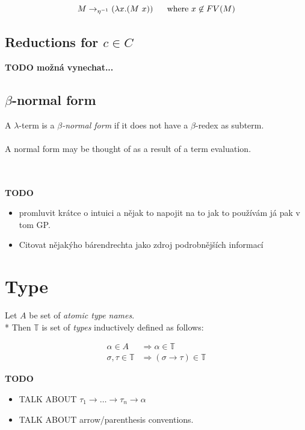 \documentclass[12pt,a4paper]{report}
\newcommand{\lterm}{$\lambda$-term\xspace}
\begin{document}
$$M \rightarrow_{\eta^{-1}} ( \lambda x . (M~x) ) \text{ ~~~~where } x \not\in FV(M) $$



\subsection{Reductions for $c \in C$}
\textbf{TODO možná vynechat...}

\subsection{$\beta$-normal form}

A \lterm is a \textit{$\beta$-normal form} if it does not have a $\beta$-redex as
subterm.
\\\\
A normal form may be thought of as a result of a term evaluation. 




~\\\\
\textbf{TODO} 
\begin{itemize} 
	\item promluvit krátce o intuici
	      a nějak to napojit na to jak to používám já
	      pak v tom GP.
	\item Citovat nějakýho bárendrechta jako zdroj podrobnějších informací
\end{itemize}

\section{Type}
\label{deftype}

	Let $A$ be set of {\it atomic type names}. \\*
	Then $\mathbb{T}$ is set of {\it types} inductively defined as follows:
	
	\begin{align*}
	\alpha      \in A          &\Rightarrow     \alpha   \in \mathbb{T} \\
	\sigma,\tau \in \mathbb{T} &\Rightarrow ( \sigma \rightarrow  \tau ) \in \mathbb{T} 
	\end{align*} 

\textbf{TODO} 
\begin{itemize}
	\item TALK ABOUT $\tau_1 \rightarrow \dots \rightarrow \tau_n \rightarrow \alpha$ 
	\item TALK ABOUT arrow/parenthesis conventions. 
\end{itemize}
	
\end{document}
